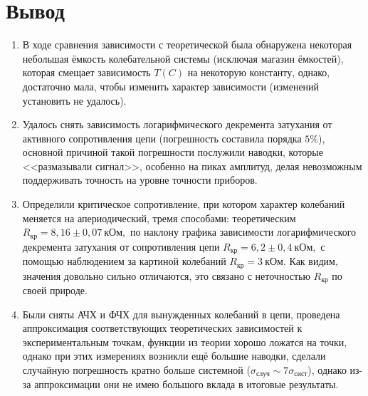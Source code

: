 \documentclass[a4paper,12pt]{extarticle}
\begin{document}
\section{Вывод}
\begin{enumerate}
    \item В ходе сравнения зависимости с теоретической была обнаружена некоторая небольшая ёмкость колебательной системы (исключая магазин ёмкостей), которая смещает зависимость $T(C)$ на некоторую константу, однако, достаточно мала, чтобы изменить характер зависимости (изменений установить не удалось).
    \item Удалось снять зависимость логарифмического декремента затухания от активного сопротивления цепи (погрешность составила порядка $5\%$), основной причиной такой погрешности послужили наводки, которые <<размазывали сигнал>>, особенно на пиках амплитуд, делая невозможным поддерживать точность на уровне точности приборов.
    \item Определили критическое сопротивление, при котором характер колебаний меняется на апериодический, тремя способами: теоретическим $R_\text{кр} = 8,16 \pm 0,07 \ \text{кОм},$ по наклону графика зависимости логарифмического декремента затухания от сопротивления цепи $R_\text{кр} = 6,2 \pm 0,4 \ \text{кОм},$ с помощью наблюдением за картиной колебаний $R_\text{кр} = 3 \ \text{кОм}.$ Как видим, значения довольно сильно отличаются, это связано с неточностью $R_\text{кр}$ по своей природе.

    \item Были сняты АЧХ и ФЧХ для вынужденных колебаний в цепи, проведена аппроксимация соответствующих теоретических зависимостей к экспериментальным точкам, функции из теории хорошо ложатся на точки, однако при этих измерениях возникли ещё большие наводки, сделали случайную погрешность кратно больше системной ($\sigma_\text{случ} \sim 7 \sigma_\text{сист}$), однако из-за аппроксимации они не имею большого вклада в итоговые результаты.


\end{enumerate}
\end{document}
